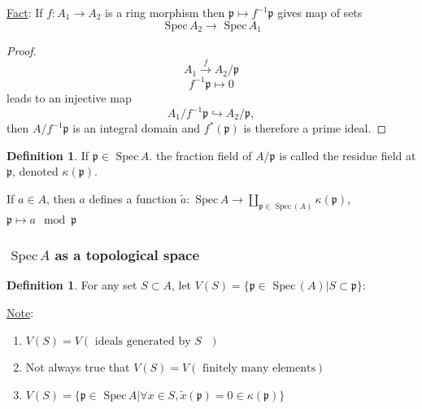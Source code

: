 \documentclass[11pt]{article}
\theoremstyle{definition}
\newtheorem{dfn}[thm]{Definition}
\newcommand{\spec}{\text{ Spec}\,}
\newcommand{\scp}{{\mathfrak p}}
\newcommand{\lrta}{\longrightarrow}
\newcommand{\inj}{\hookrightarrow}
\begin{document}
\underline{Fact}: If $f: A_1\lrta A_2$ is a ring morphism then $\scp\mapsto f^{-1}\scp$ gives map of sets
$$
\spec A_2\lrta \spec A_1
$$
\begin{proof}
$$A_1\overset{f}{\lrta}A_2/\scp$$
$$f^{-1}\scp\mapsto 0$$
 leads to an injective map
 $$
A_1/f^{-1}\scp\inj A_2/\scp,
$$ then $A/f^{-1}\scp$ is an integral domain and $f^*(\scp)$ is therefore a prime ideal.
\end{proof}

\begin{dfn}
If $\scp\in\spec A$. the fraction field of $A/\scp$ is called the residue field at $\scp$, denoted $\kappa(\scp)$. 
\end{dfn}
If $a\in A$, then $a$ defines a function
$\tilde{a}:\spec A\lrta\coprod_{\scp\in \spec(A)}\kappa(\scp)$, $\scp\mapsto a\mod \scp$


\subsubsection{$\spec A$ as a topological space}
\begin{dfn}
For any set $S\subset A$, let $V(S)=\{\scp\in\spec(A)|S\subset \scp\}$:
\end{dfn}
\underline{Note}: 
\begin{enumerate}[label=(\arabic*)]
\item $V(S)=V(\text{ ideals generated by $S$ })$
\item Not always true that $V(S)=V(\text{ finitely many elements})$
\item $V(S)=\{\scp\in\spec A|\forall x\in S, \tilde{x}(\scp)=0\in\kappa(\scp)\}$
\end{enumerate}
\end{document}
